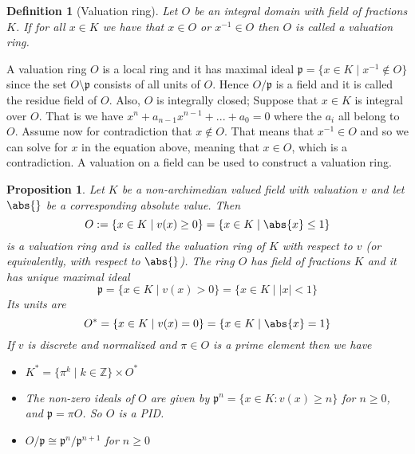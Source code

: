 \documentclass{article}
\newtheorem{definition}{Definition}[section]
\newtheorem{proposition}{Proposition}[section]
\newcommand{\mfrak}[1]{\mathfrak{#1}}
\newcommand{\mbb}[1]{\mathbb{#1}}
\begin{document}
\begin{definition}[Valuation ring]
    Let $O$ be an integral domain with field of fractions $K$. If for all $x \in K$ we have that $x \in O$ or $x^{-1} \in O$ then $O$ is called a valuation ring.
\end{definition}

A valuation ring $O$ is a local ring and it has maximal ideal $\mfrak p = \{x \in K \mid x^{-1} \notin O \}$ since the set $O \setminus \mfrak p$ consists of all units of $O$. Hence $O / \mfrak p$ is a field and it is called the residue field of $O$. Also, $O$ is integrally closed; Suppose that $x \in K$ is integral over $O$. That is we have $x^n + a_{n-1}x^{n-1} + ... + a_0 = 0$ where the $a_i$ all belong to $O$. Assume now for contradiction that $x \notin O$. That means that $x^{-1} \in O$ and so we can solve for $x$ in the equation above, meaning that $x \in O$, which is a contradiction. A valuation on a field can be used to construct a valuation ring.
\begin{proposition}\label{prop: Valuation ring of a field}
    Let $K$ be a non-archimedian valued field with valuation $v$ and let $\abs{}$ be a corresponding absolute value. Then
    $$O := \{x \in K \mid  v(x) \geq 0 \} = \{x \in K \mid  \abs{x} \leq 1 \}$$
    is a valuation ring and is called the valuation ring of $K$ with respect to $v$ (or equivalently, with respect to $\abs{}$). The ring $O$ has field of fractions $K$ and it has unique maximal ideal
    $$\mfrak p = \{x \in K \mid v(x) > 0 \} = \{x \in K \mid |x| < 1 \}$$
    Its units are
    $$O^* = \{x \in K \mid v(x) = 0\} = \{x \in K \mid \abs{x} = 1 \}$$
    If $v$ is discrete and normalized and $\pi \in O$ is a prime element then we have 
    \begin{itemize}
        \item $K^* = \{\pi^k \mid k \in \mbb Z \} \times O^*$
        \item The non-zero ideals of $O$ are given by
        $\mfrak p^n = \{x \in K : v(x) \geq n \}$
        for $n \geq 0$, and $\mfrak p = \pi O$. So $O$ is a PID.
        \item $O / \mfrak p \cong \mfrak p^n / \mfrak p^{n+1}$ for $n \geq 0$
    \end{itemize}
\end{proposition}
\end{document}
